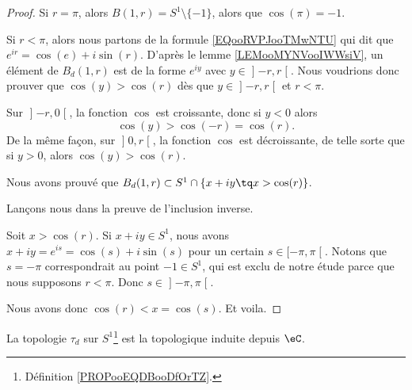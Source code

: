 \begin{proof}
    Si \( r=\pi\), alors \( B(1,r)=S^1\setminus\{ -1 \}\), alors que \( \cos(\pi)=-1\).

Si \( r<\pi\), alors nous partons de la formule \eqref{EQooRVPJooTMwNTU} qui dit que \(  e^{ir}=\cos(e)+i\sin(r)\). D'après le lemme \ref{LEMooMYNVooIWWsiV}, un élément de \( B_d(1,r)\) est de la forme \(  e^{iy}\) avec \( y\in \mathopen] -r , r \mathclose[\). Nous voudrions donc prouver que \( \cos(y)>\cos(r)\) dès que \( y\in\mathopen] -r , r \mathclose[\) et \( r<\pi\).

Sur \( \mathopen] -r , 0 \mathclose[\), la fonction \( \cos\) est croissante, donc si \( y<0\) alors 
    \begin{equation}
        \cos(y)>\cos(-r)=\cos(r).
    \end{equation}
De la même façon, sur \( \mathopen] 0,r \mathclose[\), la fonction \( \cos\) est décroissante, de telle sorte que si \( y>0\), alors \( \cos(y)>\cos(r)\).

    Nous avons prouvé que \( B_d(1,r)\subset S^1\cap  \{ x+iy\tq x>\cos(r) \}\). 

    Lançons nous dans la preuve de l'inclusion inverse.

    Soit \( x>\cos(r)\). Si \( x+iy\in S^1\), nous avons \( x+iy= e^{is}=\cos(s)+i\sin(s)\) pour un certain \( s\in\mathopen[ -\pi , \pi \mathclose[\). Notons que \( s=-\pi\) correspondrait au point \( -1\in S^1\), qui est exclu de notre étude parce que nous supposons \( r<\pi\). Donc \( s\in\mathopen] -\pi , \pi \mathclose[\).

    Nous avons donc \( \cos(r)<x=\cos(s)\). Et voila.
\end{proof}

\begin{proposition}
    La topologie \( \tau_d\) sur \( S^1\)\footnote{Définition \ref{PROPooEQDBooDfOrTZ}.} est la topologique induite depuis \( \eC\).
\end{proposition}

